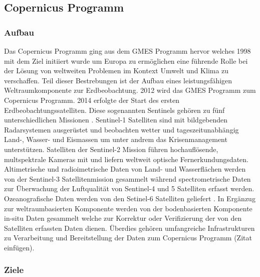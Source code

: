 \subsection{Copernicus Programm}
\subsubsection{Aufbau}
Das Copernicus Programm ging aus dem GMES Programm hervor welches 1998 mit dem Ziel initiiert wurde um Europa zu ermöglichen eine führende Rolle bei der Lösung von 
weltweiten Problemen im Kontext Umwelt und Klima zu verschaffen. Teil dieser Bestrebungen ist der Aufbau eines leistungsfähigen Weltraumkomponente zur Erdbeobachtung.
2012 wird das GMES Programm zum Copernicus Programm. 2014 erfolgte der Start des ersten Erdbeobachtungssatelliten. Diese sogenannten Sentinels gehören zu fünf unterschiedlichen 
Missionen \cite{history_of_copernicus}. 
Sentinel-1 Satelliten sind mit bildgebenden Radarsystemen ausgerüstet und beobachten wetter und tageszeitunabhängig Land-, Wasser- und Eismassen um unter andrem das Krisenmanagement
unterstützen. Satelliten der Sentinel-2 Mission führen hochauflösende, multspektrale Kameras mit und liefern weltweit optische Fernerkundungsdaten. Altimetrische und radioimetrische
Daten von Land- und Wasserflächen werden von der Sentinel-3 Satellitenmission gesammelt während spectrometrische Daten zur Überwachung der Luftqualität von Sentinel-4 und 5 Satelliten 
erfasst werden. Ozeanografische Daten werden von den Setinel-6 Satelliten geliefert \cite{sentinel_overview}. In Ergänzug zur weltraumbasierten Komponente werden von der bodenbasierten
Komponente in-situ Daten gesammelt welche zur Korrektur oder Verifizierung der von den Satelliten erfassten Daten dienen. 
Überdies gehören umfangreiche Infrastrukturen zu Verarbeitung und Bereitstellung der Daten zum Copernicus Programm (Zitat einfügen). 
\subsubsection{Ziele}
